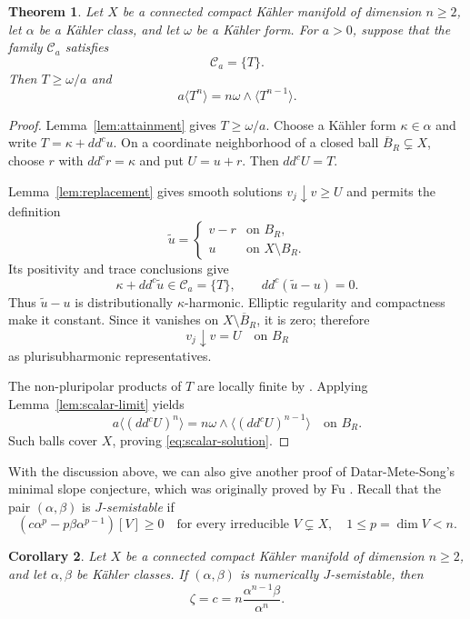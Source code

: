 \documentclass[reqno]{amsart}
\numberwithin{equation}{section}
\newtheorem{theorem}{Theorem}[section]
\newtheorem{corollary}[theorem]{Corollary}
\theoremstyle{definition}
\begin{document}
\begin{theorem}\label{thm:scalar}
Let $X$ be a connected compact K\"ahler manifold of dimension
$n\ge2$, let $\alpha$ be a K\"ahler class, and let $\omega$
be a K\"ahler form. For $a>0$, suppose that the family $\mathcal C_a$ satisfies
\[
\mathcal C_a=\{T\}.
\]
Then $T\ge\omega/a$ and
\begin{equation}\label{eq:scalar-solution}
a\langle T^n\rangle
=n\omega\wedge\langle T^{n-1}\rangle.
\end{equation}
\end{theorem}
\begin{proof}
Lemma~\ref{lem:attainment} gives
$T\ge\omega/a$. Choose a K\"ahler form $\kappa\in\alpha$
and write $T=\kappa+dd^cu$.
On a coordinate neighborhood of a closed ball
$\overline B_R\subsetneq X$, choose $r$ with $dd^cr=\kappa$
and put $U=u+r$. Then $dd^cU=T$.

Lemma~\ref{lem:replacement} gives smooth
solutions $v_j\downarrow v\ge U$ and permits the definition
\[
\widetilde u=
\begin{cases}
v-r&\text{on }B_R,\\
u&\text{on }X\setminus B_R.
\end{cases}
\]
Its positivity and trace conclusions give
\[
\kappa+dd^c\widetilde u
\in\mathcal C_a=\{T\},
\qquad
dd^c(\widetilde u-u)=0.
\]
Thus $\widetilde u-u$ is distributionally $\kappa$-harmonic.
Elliptic regularity and compactness make it constant.
Since it vanishes on $X\setminus\overline B_R$, it is zero;
therefore
\[
v_j\downarrow v=U\quad\text{on }B_R
\]
as plurisubharmonic representatives.

The non-pluripolar products of $T$ are locally finite by
\cite[Proposition 1.6]{BEGZ10}. Applying
Lemma~\ref{lem:scalar-limit} yields
\[
a\langle(dd^cU)^n\rangle
=n\omega\wedge\langle(dd^cU)^{n-1}\rangle
\quad\text{on }B_R.
\]
Such balls cover $X$, proving
\eqref{eq:scalar-solution}.\qedhere
\end{proof}

With the discussion above, we can also give another proof of Datar-Mete-Song's minimal slope conjecture, which was originally proved by Fu \cite{F26}.
Recall that the pair $(\alpha,\beta)$ is \emph{$J$-semistable} if
\[
 (c\alpha^p-p\beta\alpha^{p-1})[V]\ge0
 \quad\text{for every irreducible }V\subsetneq X,\quad 1\le p=\dim V<n.
\]
\begin{corollary}\label{cor:semistable}
Let $X$ be a connected compact K\"ahler manifold of dimension
$n\ge2$, and let $\alpha,\beta$ be K\"ahler classes.
If $(\alpha,\beta)$ is numerically $J$-semistable, then
\[
\zeta
=c=n\frac{\alpha^{n-1}\beta}{\alpha^n}.
\]
\end{corollary}
\end{document}
